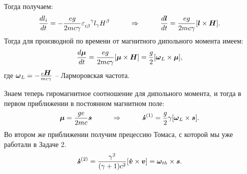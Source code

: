 Тогда получаем:
\begin{equation*}
	\frac{d l_i}{d t} = - \frac{e g}{2 m c \gamma} \varepsilon_{i \beta}^{\phantom{0}\phantom{0}\gamma}  l_\gamma H^\beta
	\hspace{1 cm}
	\Rightarrow
	\hspace{1 cm}
	\frac{d \mbox{\boldmath $l$}}{d t} = \frac{e g}{2 m c \gamma} [\mbox{\boldmath $l$} \times \mbox{\boldmath $H$}].
\end{equation*}
Тогда для производной по времени от магнитного дипольного момента имеем:
\begin{equation*}
	\frac{d \mbox{\boldmath $\mu$}}{d t} = \frac{e g}{2 m c \gamma} [\mbox{\boldmath $\mu$} \times \mbox{\boldmath $H$}] = \frac{g}{2} [\mbox{\boldmath $\omega$}_L \times \mbox{\boldmath $\mu$}],
\end{equation*}
где $\mbox{\boldmath $\omega$}_L = - \frac{e \mbox{\boldmath $H$}}{m c \gamma}$ -- Ларморовская частота.

Знаем теперь гиромагнитное соотношение для дипольного момента, и тогда в первом приближении в постоянном магнитном поле:
\begin{equation*}
	\mbox{\boldmath $\mu$} = \frac{g e}{2 m c} \mbox{\boldmath $s$}
	\hspace{1 cm}
	\Rightarrow
	\hspace{1 cm}
	\mbox{\boldmath $\dot{s}$}^{(1)} = \frac{g}{2} \gamma [\mbox{\boldmath $\omega$}_L \times \mbox{\boldmath $s$}].
\end{equation*}
Во втором же приближении получим прецессию Томаса, с которой мы уже работали в Задаче 2.
\begin{equation*}
	\mbox{\boldmath $\dot{s}$}^{(2)} = \frac{\gamma^2}{(\gamma+1)c^2} [\mbox{\boldmath $\dot{v}$} \times \mbox{\boldmath $v$}] = \mbox{\boldmath $\omega$}_{th} \times \mbox{\boldmath $s$}.
\end{equation*}

